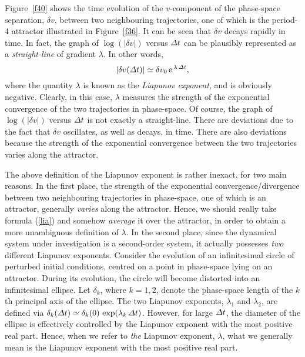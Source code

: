 Figure~\ref{f40} shows the time evolution of the $v$-component of the phase-space
separation, $\delta v$, between two neighbouring trajectories, one of which is the period-4
attractor illustrated in Figure~\ref{f36}. It can be seen that $\delta v$ decays rapidly
in time. In fact, the graph of $\log(|\delta v|)$ versus ${\mit\Delta} t$ can be plausibly
represented as a {\em straight-line} of gradient $\lambda$. In other words,
\begin{equation}
|\delta v({\mit\Delta} t)| \simeq \delta v_0\,{\rm e}^{\,\lambda\,{\mit\Delta t}},\label{lia}
\end{equation}
where the quantity $\lambda$ is known as the {\em Liapunov exponent}, and is obviously negative. Clearly, in this case,
$\lambda$ measures the strength of the exponential convergence of the two
trajectories in phase-space. 
Of course,
the  graph of $\log(|\delta v|)$ versus ${\mit\Delta} t$ is not exactly a straight-line. There
are deviations due to the fact that $\delta v$ oscillates, as well as decays, in time.
There are  
also deviations because the strength
of the exponential convergence between the two trajectories varies along the attractor. 

The above definition of the Liapunov exponent is rather inexact, for
two main reasons. In the first place,
the strength
of the exponential convergence/divergence between  two neighbouring trajectories in phase-space,
one of which is an attractor, generally {\em varies}\/ along the attractor. Hence, we should really
take formula (\ref{lia}) and somehow {\em average}\/ it over the attractor,
in order to obtain a more unambiguous definition of $\lambda$. In the second place,
since the dynamical system under investigation  is a second-order system, it actually possesses {\em two}\/
different Liapunov exponents. Consider the evolution of an infinitesimal circle of perturbed
initial conditions, centred on a point in phase-space
lying on an attractor. During its evolution, the circle will become
distorted into an infinitesimal ellipse. Let $\delta_k$, where $k=1,2$, denote the phase-space
length of the $k$th principal axis of the ellipse. The two Liapunov exponents, $\lambda_1$ and $\lambda_2$,
are defined via $\delta_k({\mit\Delta}t)\simeq \delta_k(0)\,\exp(\lambda_k\,{\mit\Delta}t)$. 
However, for large ${\mit\Delta}t$, the diameter of the ellipse is effectively controlled by the 
Liapunov exponent with the most positive real part. Hence, when we refer to
{\em the}\/ Liapunov exponent, $\lambda$, what we generally mean is the Liapunov 
exponent with the most positive real part. 

